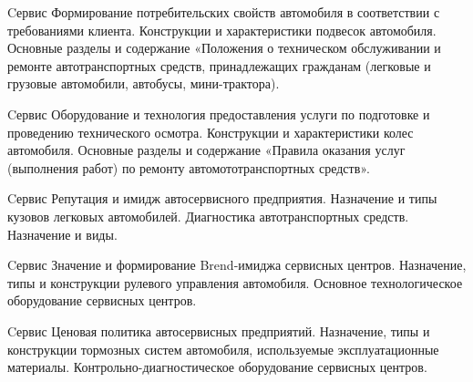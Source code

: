 \documentclass[
	11pt,
	a4paper,
	]
	{article}
\begin{document}
\vfill



\begin{minipage}[t][\miniH]{\miniL}\centering
	 {Cервис}
		{
			Формирование потребительских свойств автомобиля в соответствии с требованиями клиента.
		}{
			Конструкции и характеристики подвесок автомобиля.
		}{
			Основные разделы и содержание «Положения о техническом обслуживании и ремонте автотранспортных средств, принадлежащих гражданам (легковые и грузовые автомобили, автобусы, мини-трактора).
		}
	\lowGE
\end{minipage}

\vfill



\begin{minipage}[t][\miniH]{\miniL}\centering
	 {Cервис}
		{
			Оборудование и технология предоставления услуги по подготовке и проведению технического осмотра.
		}{
			Конструкции и характеристики колес автомобиля.
		}{
			Основные разделы и содержание «Правила оказания услуг (выполнения работ) по ремонту автомототранспортных средств».
		}
	\lowGE
\end{minipage}





\begin{minipage}[t][\miniH]{\miniL}\centering
	 {Cервис}
		{
			Репутация и имидж автосервисного предприятия.
		}{
			Назначение и типы кузовов легковых автомобилей.
		}{
			Диагностика автотранспортных средств. Назначение и виды.
		}
	\lowGE
\end{minipage}

\vfill



\begin{minipage}[t][\miniH]{\miniL}\centering
	 {Cервис}
		{
			Значение и формирование Brend-имиджа сервисных центров.
		}{
			Назначение, типы и конструкции рулевого управления автомобиля.
		}{
			Основное технологическое оборудование сервисных центров.
		}
	\lowGE
\end{minipage}

\vfill



\begin{minipage}[t][\miniH]{\miniL}\centering
	 {Cервис}
		{
			Ценовая политика автосервисных предприятий.
		}{
			Назначение, типы и конструкции тормозных систем автомобиля, используемые эксплуатационные материалы.
		}{
			Контрольно-диагностическое оборудование сервисных центров.
		}
	\lowGE
\end{minipage}
\end{document}
